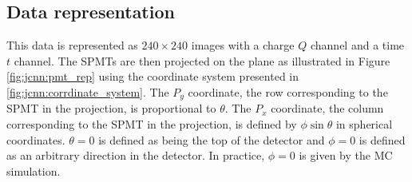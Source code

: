 \documentclass[../main.tex]{subfiles}
\begin{document}
{{\subsection{Data representation}
\label{sec:jcnn:data}

This data is represented as $240 \times 240$ images with a charge $Q$ channel and a time $t$ channel. The SPMTs are then projected on the plane as illustrated in Figure \ref{fig:jcnn:pmt_rep} using the coordinate system presented in \ref{fig:jcnn:corrdinate_system}. The $P_y$ coordinate, the row corresponding to the SPMT in the projection, is proportional to $\theta$. The $P_x$ coordinate, the column corresponding to the SPMT in the projection, is defined by $\phi \sin{\theta}$ in spherical coordinates. $\theta = 0$ is defined as being the top of the detector and $\phi = 0$ is defined as an arbitrary direction in the detector. In practice, $\phi = 0$ is given by the MC simulation.

}}
\end{document}
